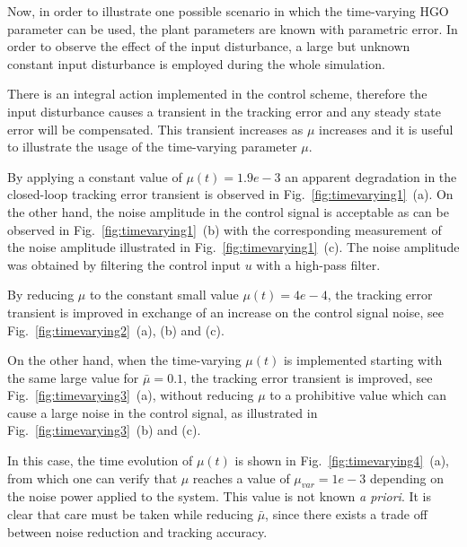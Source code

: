\documentclass[letterpaper, 10 pt, journal, twocolumn]{IEEEtran}  %
\theoremstyle{plain}
\theoremstyle{definition}
\theoremstyle{remark}
\begin{document}
%
%
Now, in order to illustrate one possible scenario in which the time-varying HGO parameter can be used, the plant parameters are known with parametric error. In order to observe the effect of the input disturbance, a large but unknown constant input disturbance is employed during the whole simulation. 

There is an integral action implemented in the control scheme, therefore the input disturbance causes a transient in the tracking error and any steady state error will be compensated. This transient increases as $\mu$ increases and it is useful to illustrate the usage of the time-varying parameter $\mu$.


By applying a constant value of $\mu(t)= 1.9e-3$ an apparent degradation in the closed-loop tracking error transient is observed in Fig.~\ref{fig:timevarying1}~(a). On the other hand, the noise amplitude in the control signal is acceptable as can be observed in Fig.~\ref{fig:timevarying1}~(b) with the corresponding measurement of the noise amplitude illustrated in Fig.~\ref{fig:timevarying1}~(c). The noise amplitude was obtained by filtering the control input $u$ with a high-pass filter. 
%

%
By reducing $\mu$ to the constant small value $\mu(t)=4e-4$, the  tracking error transient is improved in exchange of an increase on the control signal noise, see  Fig.~\ref{fig:timevarying2}~(a), (b) and (c).
%

%
On the other hand, when the time-varying $\mu(t)$ is implemented starting with the same large value for
$\bar{\mu}\!=\!0.1$,
the tracking error transient is improved, see Fig.~\ref{fig:timevarying3}~(a), without reducing $\mu$ to a prohibitive value which can cause a large noise in the control signal, as illustrated in Fig.~\ref{fig:timevarying3}~(b) and (c). 
%

%
In this case, the time
evolution of $\mu(t)$ is shown in Fig.~\ref{fig:timevarying4}~(a), from which one can verify
that $\mu$ reaches a value of $\mu_{var}=1e-3$ depending on the noise power applied  to the system. 
This value is not known {\em a priori}. It is clear that care must be taken while reducing $\bar{\mu}$, since there exists a trade off
between noise reduction and tracking accuracy.
%
%
\end{document}

